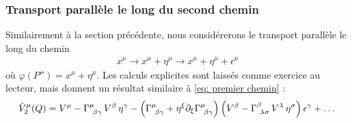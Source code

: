 \subsubsection{Transport parallèle le long du second chemin}
Similairement à la section précédente, nous considérerons le transport parallèle le long du chemin
\begin{align}
        x^\mu \rightarrow x^\mu+\eta^\mu \rightarrow  x^\mu + \eta^\mu + \epsilon^\mu
\end{align}
où $\varphi(P'') = x^\mu+\eta^\mu$. Les calculs explicites sont laissés comme exercice au lecteur, mais donnent un résultat similaire à \ref{eq: premier chemin} :
\begin{equation}
    \label{eq: second chemin}
    \hat{V}^\mu_2 (Q) = V^\mu - \Gamma\indices{^\mu_{\!\beta \gamma}}  \, V^\beta \, \eta^\gamma - \lt \Gamma\indices{^\mu_{\!\beta \gamma}} + \eta^\xi \pd_\xi \Gamma\indices{^\mu_{\!\beta \gamma}} \rt \lt V^\beta - \Gamma\indices{^\beta_{\!\lambda \sigma}} \, V^\lambda \, \eta^\sigma \rt \epsilon^\gamma +  \dots
\end{equation} 
